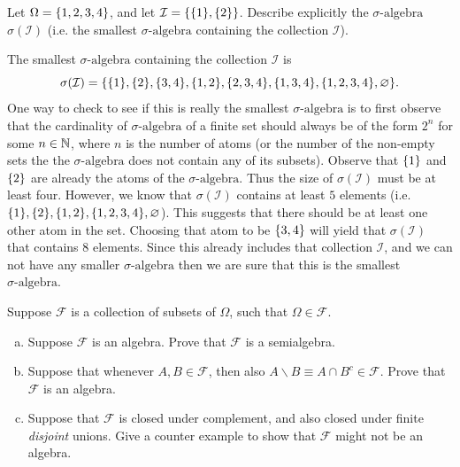 \begin{problem}
	Let $ \Omega = \{1,2,3,4\} $, and let $ \mathcal{I} = \{\{1\},\{2\}\} $. Describe explicitly the $\sigma\text{-algebra}$ $ \sigma(\mathcal{I}) $ (i.e. the smallest $\sigma\text{-algebra}$ containing the collection $ \mathcal{I} $).
\end{problem}
\begin{solution}
	The smallest $\sigma\text{-algebra}$ containing the collection $ \mathcal{I} $ is
	\[ \sigma(\mathcal{I}) = \{\{1\},\{2\},\{3,4\},\{1,2\},\{2,3,4\},\{1,3,4\},\{1,2,3,4\},\varnothing\}. \]
	One way to check to see if this is really the smallest $\sigma\text{-algebra}$ is to first observe that the cardinality of $\sigma\text{-algebra}$ of a finite set should always be of the form $ 2^n $ for some $ n \in \mathbb{N} $, where $ n $ is the number of atoms (or the number of the non-empty sets the the $\sigma\text{-algebra}$ does not contain any of its subsets). Observe that $ \{1\} $ and $ \{2\} $ are already the atoms of the $\sigma\text{-algebra}$. Thus the size of $ \sigma(\mathcal{I}) $ must be at least four. However, we know that $ \sigma(\mathcal{I}) $ contains at least $ 5 $ elements (i.e. $ \{1\},\{2\},\{1,2\},\{1,2,3,4\},\varnothing $). This suggests that there should be at least one other atom in the set. Choosing that atom to be $ \{3,4\} $ will yield that $ \sigma(\mathcal{I}) $ that contains $ 8 $ elements. Since this already includes that collection $ \mathcal{I} $, and we can not have any smaller $\sigma\text{-algebra}$ then we are sure that this is the smallest $\sigma\text{-algebra}$.
\end{solution}


\begin{problem}
	Suppose $ \mathcal{F} $ is a collection of subsets of $ \Omega $, such that $ \Omega \in \mathcal{F} $.
	\begin{enumerate}[(a)]
		\item Suppose $ \mathcal{F} $ is an algebra. Prove that $ \mathcal{F} $ is a semialgebra.
		\item Suppose that whenever $ A,B \in \mathcal{F} $, then also $ A\backslash B \equiv A \cap B^c \in \mathcal{F} $. Prove that $ \mathcal{F} $ is an algebra. 
		\item Suppose that $ \mathcal{F} $ is closed under complement, and also closed under finite \emph{disjoint} unions. Give a counter example to show that $ \mathcal{F} $ might not be an algebra. 
	\end{enumerate}
\end{problem}

